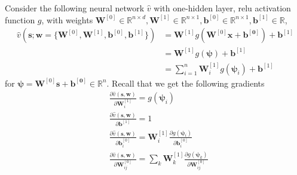 Consider the following neural network $\hat v$ with one-hidden layer, relu activation function $g$, with weights $\mathbf{W}^{[0]} \in \mathbb{R}^{n\times d}, \mathbf{W}^{[1]} \in \mathbb{R}^{n\times 1},\mathbf{b}^{[0]} \in \mathbb{R}^{n \times 1}, \mathbf{b}^{[1]} \in \mathbb{R}$, 
%
\begin{align*}
\hat v(\mathbf{s}; \mathbf{w} = \{\mathbf{W}^{[0]}, \mathbf{W}^{[1]},\mathbf{b}^{[0]}, \mathbf{b}^{[1]}\}) 
&= \mathbf{W}^{[1]}g(\mathbf{W}^{[0]} \mathbf{x} + \mathbf{b^{[0]}}) + \mathbf{b}^{[1]}\\
&= \mathbf{W}^{[1]}g(\boldsymbol{\psi}) + \mathbf{b}^{[1]}\\
&= \sum_{i=1}^n \mathbf{W}^{[1]}_i g(\boldsymbol{\psi}_i) + \mathbf{b}^{[1]}
\end{align*}
%
for $\boldsymbol{\psi} = \mathbf{W}^{[0]} \mathbf{s} + \mathbf{b^{[0]}} \in \mathbb{R}^n$. 
Recall that we get the following gradients 
\begin{align*}
	&\frac{\partial \hat{v}(\mathbf{s}, \mathbf{w})}{\partial \mathbf{W}_{i}^{[1]}} = g(\boldsymbol{\psi}_i) \\
	&\frac{\partial \hat{v}(\mathbf{s}, \mathbf{w})}{\partial \mathbf{b}^{[1]}} =1\\
	&\frac{\partial \hat{v}(\mathbf{s}, \mathbf{w})}{\partial \mathbf{b}_i^{[0]}} =
	\mathbf{W}_{i}^{[1]}
	\frac{\partial g(\boldsymbol{\psi}_i)}{\partial \mathbf{b}^{[0]}_i}   \\
	&\frac{\partial \hat{v}(\mathbf{s}, \mathbf{w})}{\partial \mathbf{W}_{ij}^{[0]}} = 
	\sum_k \mathbf{W}_{k}^{[1]}
	\frac{\partial g(\boldsymbol{\psi}_k)}{\partial \mathbf{W}_{ij}^{[0]}}\\
\end{align*}
